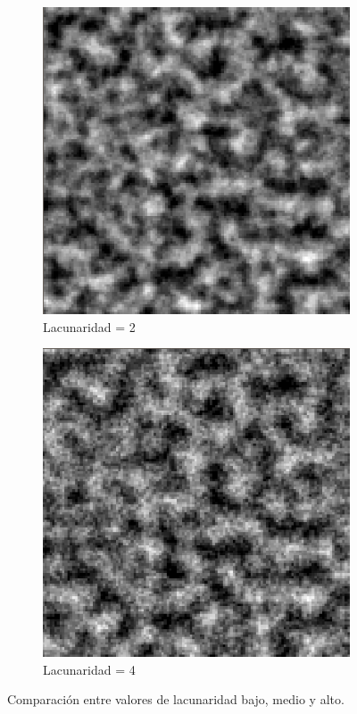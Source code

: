 \begin{figure}[ht]
\begin{subfigure}{0.3\linewidth}
        \includegraphics[width=\linewidth]{img/MediumLacunarity.png}
        \caption{Lacunaridad = 2 }
    \end{subfigure}
    \hfill
    \begin{subfigure}{0.3\linewidth}
        \centering
        \includegraphics[width=\linewidth]{img/HightLacunarity.png}
        \caption{Lacunaridad = 4 }
    \end{subfigure}
    \caption{Comparación entre valores de lacunaridad bajo, medio y alto.}
\end{figure}

